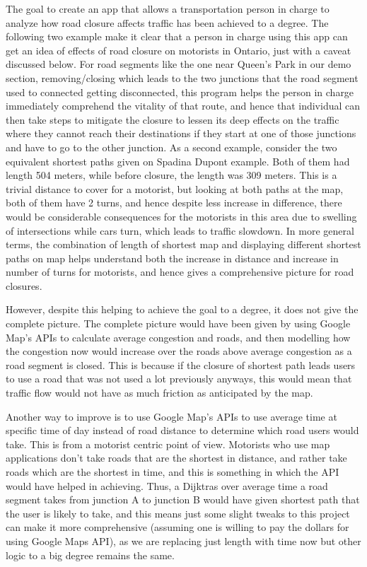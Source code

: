 \documentclass[fontsize=11pt]{article}
\begin{document}
The goal to create an app that allows a transportation person in charge to analyze how road closure affects traffic has been achieved to a degree. The following two example make it clear that a person in charge using this app can get an idea of effects of road closure on motorists in Ontario, just with a caveat discussed below. For road segments like the one near Queen's Park in our demo section, removing/closing which leads to the two junctions that the road segment used to connected getting disconnected, this program helps the person in charge immediately comprehend the vitality of that route, and hence that individual can then take steps to mitigate the closure to lessen its deep effects on the traffic where they cannot reach their destinations if they start at one of those junctions and have to go to the other junction. As a second example, consider the two equivalent shortest paths given on Spadina Dupont example. Both of them had length 504 meters, while before closure, the length was 309 meters. This is a trivial distance to cover for a motorist, but looking at both paths at the map, both of them have 2 turns, and hence despite less increase in difference, there would be considerable consequences for the motorists in this area due to swelling of intersections while cars turn, which leads to traffic slowdown. In more general terms, the combination of length of shortest map and displaying different shortest paths on map helps understand both the increase in distance and increase in number of turns for motorists, and hence gives a comprehensive picture for road closures.

However, despite this helping to achieve the goal to a degree, it does not give the complete picture. The complete picture would have been given by using Google Map's APIs to calculate average congestion and roads, and then modelling how the congestion now would increase over the roads above average congestion as a road segment is closed. This is because if the closure of shortest path leads users to use a road that was not used a lot previously anyways, this would mean that traffic flow would not have as much friction as anticipated by the map. 

Another way to improve is to use Google Map's APIs to use average time at specific time of day instead of road distance to determine which road users would take. This is from a motorist centric point of view. Motorists who use map applications don't take roads that are the shortest in distance, and rather take roads which are the shortest in time, and this is something in which the API would have helped in achieving. Thus, a Dijktras over average time a road segment takes from junction A to junction B would have given shortest path that the user is likely to take, and this means just some slight tweaks to this project can make it more comprehensive (assuming one is willing to pay the dollars for using Google Maps API), as we are replacing just length with time now but other logic to a big degree remains the same.
\end{document}
